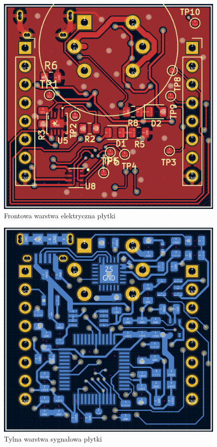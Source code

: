 \begin{figure}
    \centering
    \includegraphics[width=\textwidth, height=\textheight, keepaspectratio]{Graphics/pcb_front.png}
    \caption{Frontowa warstwa elektryczna płytki}
    \label{img:front_layout}
\end{figure}

\begin{figure}
    \centering
    \includegraphics[width=\textwidth, height=\textheight, keepaspectratio]{Graphics/pcb_back.png}
    \caption{Tylna warstwa sygnałowa płytki}
    \label{img:back_layout}
\end{figure}

